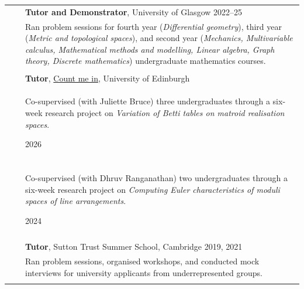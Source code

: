 \documentclass[10pt]{article}
\begin{document}
\begin{longtable}{>{\raggedleft\arraybackslash}p{0.82in}>{}p{0.05in}>{}p{5.5in}}
    \multirow{2}{0.8in}{\raggedleft\arraybackslash Teaching \& outreach}%
     &  & \textbf{Tutor and Demonstrator}, University of Glasgow \hfill
    2022--25                                                                               \\[0.25em]
     &  & \begin{minipage}[c]{4.3in}
              Ran problem sessions for fourth year (\emph{Differential geometry}),
              third year (\emph{Metric and topological spaces}), and second year
              (\emph{Mechanics, Multivariable calculus, Mathematical methods and
                  modelling, Linear algebra, Graph theory, Discrete mathematics})
              undergraduate mathematics courses.
          \end{minipage}          \\\\[-0.6em]
     &  & \textbf{Tutor}, \href{https://www.agq-cdt.org/count-me-in/}{Count me
                              in}, University of Edinburgh              \\[0.25em]
     &  & \begin{minipage}[t]{4.3in}
              Co-supervised (with Juliette Bruce) three undergraduates
              through a six-week research project on \emph{Variation of Betti
                  tables on matroid realisation spaces}.
          \end{minipage} \hfill 2026               \\\\[-0.8em]
     &  & \begin{minipage}[t]{4.3in}
              Co-supervised (with Dhruv Ranganathan) two undergraduates
              through a six-week research project on \emph{Computing Euler
                  characteristics of moduli spaces of line arrangements}.
          \end{minipage} \hfill 2024                  \\\\[-0.6em]
     &  & \textbf{Tutor}, Sutton Trust Summer School, Cambridge \hfill
    2019, 2021                                                                             \\[0.25em]
     &  & \begin{minipage}[c]{4.3in}
              Ran problem sessions, organised workshops, and conducted mock interviews
              for university applicants from underrepresented groups.
          \end{minipage}      \\\\[-0.4em]

\end{longtable}
\end{document}
